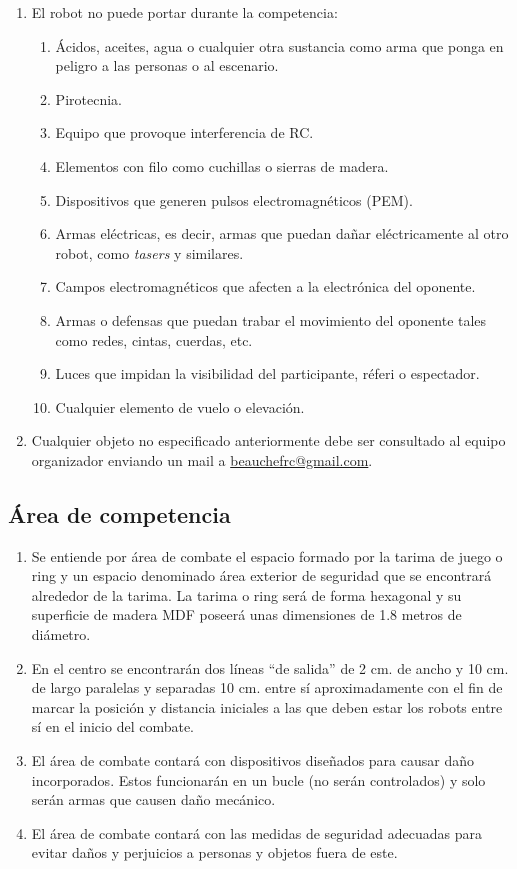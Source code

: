 \documentclass[11pt]{article}
\begin{document}
\begin{enumerate}
    \item 
    \label{it:no_permitido} El robot no puede portar durante la competencia:
    \begin{enumerate}
        \item Ácidos, aceites, agua o cualquier otra sustancia como arma que ponga en peligro a las personas o al escenario.
        \item Pirotecnia.
        \item Equipo que provoque interferencia de RC.
        \item Elementos con filo como cuchillas o sierras de madera.
        \item Dispositivos que generen pulsos electromagnéticos (PEM).
        \item Armas eléctricas, es decir, armas que puedan dañar eléctricamente al otro robot, como \textit{tasers} y similares.
        \item Campos electromagnéticos que afecten a la electrónica del oponente. 
        \item Armas o defensas que puedan trabar el movimiento del oponente tales como redes, cintas, cuerdas, etc.
        \item Luces que impidan la visibilidad del participante, réferi o espectador.
        \item Cualquier elemento de vuelo o elevación.
    \end{enumerate}
    \item Cualquier objeto no especificado anteriormente debe ser consultado al equipo organizador enviando un mail a \href{mailto:beauchefrc@gmail.com}{beauchefrc@gmail.com}.
    
\end{enumerate}

\subsection{Área de competencia}
\begin{enumerate}
    \item Se entiende por área de combate el espacio formado por la tarima de juego o ring y un espacio denominado área exterior de seguridad que se encontrará alrededor de la tarima. La tarima o ring será de forma hexagonal y su superficie de madera MDF poseerá unas dimensiones de 1.8 metros de diámetro.
    \item En el centro se encontrarán dos líneas “de salida” de 2 cm. de ancho y 10 cm. de largo paralelas y separadas 10 cm. entre sí aproximadamente con el fin de marcar la posición y distancia iniciales a las que deben estar los robots entre sí en el inicio del combate.
    \item El área de combate contará con dispositivos diseñados para causar daño incorporados. Estos funcionarán en un bucle (no serán controlados) y solo serán armas que causen daño mecánico.
    \item El área de combate contará con las medidas de seguridad adecuadas para evitar daños y perjuicios a personas y objetos fuera de este.
\end{enumerate}
\end{document}
